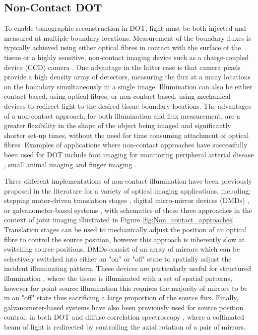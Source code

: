 \documentclass[twoside]{bhamthesis}
\theoremstyle{definition}
\begin{document}
\subsection{Non-Contact DOT}
\label{section:Non-Contact DOT}
To enable tomographic reconstruction in DOT, light must be both injected and measured at multiple boundary locations. Measurement of the boundary fluxes is typically achieved using either optical fibres in contact with the surface of the tissue \cite{eggebrecht2014mapping} or a highly sensitive, non-contact imaging device such as a charge-coupled device (CCD) camera \cite{hielscher2004sagittal}. One advantage in the latter case is that camera pixels provide a high density array of detectors, measuring the flux at a many locations on the boundary simultaneously in a single image. Illumination can also be either contact-based, using optical fibres, or non-contact based, using mechanical devices to redirect light to the desired tissue boundary locations. 
The advantages of a non-contact approach, for both illumination and flux measurement, are a greater flexibility in the shape of the object being imaged and significantly shorter set-up times, without the need for time consuming attachment of optical fibres. Examples of applications where non-contact approaches have successfully been used for DOT include foot imaging for monitoring peripheral arterial disease \cite{hoi2018non}, small animal imaging \cite{guggenheim2013multi,reisman2017structured} and finger imaging \cite{hielscher2004sagittal}.

Three different implementations of non-contact illumination have been previously proposed in the literature for a variety of optical imaging applications, including; stepping motor-driven translation stages \cite{hielscher2004sagittal,wu2016development,taylor2016development,lighter2017multispectral}, digital micro-mirror devices (DMDs) \cite{guggenheim2013multi}, or galvanometer-based systems \cite{ren2016non,han2015non}, with schematics of these three approaches in the context of joint imaging illustrated in Figure \ref{fig:Non_contact_approaches}. Translation stages can be used to mechanically adjust the position of an optical fibre to control the source position, however this approach is inherently slow at switching source positions. DMDs consist of an array of mirrors which can be selectively switched into either an "on" or "off" state to spatially adjust the incident illuminating pattern. These devices are particularly useful for structured illumination \cite{belanger2010real}, where the tissue is illuminated with a set of spatial patterns, however for point source illumination this requires the majority of mirrors to be in an "off" state thus sacrificing a large proportion of the source flux. Finally, galvanometer-based systems have also been previously used for source position control, in both DOT \cite{ren2016non} and diffuse correlation spectroscopy \cite{han2015non}, where a collimated beam of light is redirected by controlling the axial rotation of a pair of mirrors. 
\end{document}
